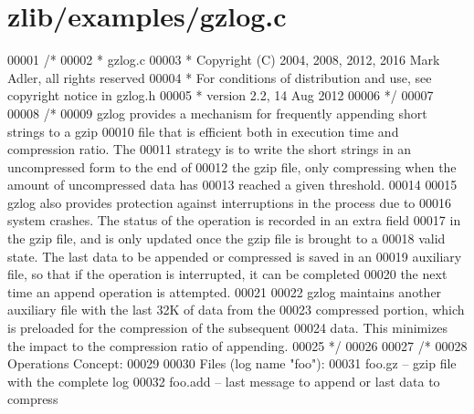 \hypertarget{zlib_2examples_2gzlog_8c_source}{}\section{zlib/examples/gzlog.c}
\label{zlib_2examples_2gzlog_8c_source}

\begin{DoxyCode}
00001 \textcolor{comment}{/*}
00002 \textcolor{comment}{ * gzlog.c}
00003 \textcolor{comment}{ * Copyright (C) 2004, 2008, 2012, 2016 Mark Adler, all rights reserved}
00004 \textcolor{comment}{ * For conditions of distribution and use, see copyright notice in gzlog.h}
00005 \textcolor{comment}{ * version 2.2, 14 Aug 2012}
00006 \textcolor{comment}{ */}
00007 
00008 \textcolor{comment}{/*}
00009 \textcolor{comment}{   gzlog provides a mechanism for frequently appending short strings to a gzip}
00010 \textcolor{comment}{   file that is efficient both in execution time and compression ratio.  The}
00011 \textcolor{comment}{   strategy is to write the short strings in an uncompressed form to the end of}
00012 \textcolor{comment}{   the gzip file, only compressing when the amount of uncompressed data has}
00013 \textcolor{comment}{   reached a given threshold.}
00014 \textcolor{comment}{}
00015 \textcolor{comment}{   gzlog also provides protection against interruptions in the process due to}
00016 \textcolor{comment}{   system crashes.  The status of the operation is recorded in an extra field}
00017 \textcolor{comment}{   in the gzip file, and is only updated once the gzip file is brought to a}
00018 \textcolor{comment}{   valid state.  The last data to be appended or compressed is saved in an}
00019 \textcolor{comment}{   auxiliary file, so that if the operation is interrupted, it can be completed}
00020 \textcolor{comment}{   the next time an append operation is attempted.}
00021 \textcolor{comment}{}
00022 \textcolor{comment}{   gzlog maintains another auxiliary file with the last 32K of data from the}
00023 \textcolor{comment}{   compressed portion, which is preloaded for the compression of the subsequent}
00024 \textcolor{comment}{   data.  This minimizes the impact to the compression ratio of appending.}
00025 \textcolor{comment}{ */}
00026 
00027 \textcolor{comment}{/*}
00028 \textcolor{comment}{   Operations Concept:}
00029 \textcolor{comment}{}
00030 \textcolor{comment}{   Files (log name "foo"):}
00031 \textcolor{comment}{   foo.gz -- gzip file with the complete log}
00032 \textcolor{comment}{   foo.add -- last message to append or last data to compress}

\end{DoxyCode}
